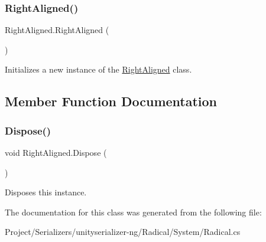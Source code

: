 \subsubsection{\texorpdfstring{Right\+Aligned()}{RightAligned()}}
{\footnotesize\ttfamily Right\+Aligned.\+Right\+Aligned (\begin{DoxyParamCaption}{ }\end{DoxyParamCaption})\hspace{0.3cm}{\ttfamily [inline]}}



Initializes a new instance of the \hyperlink{class_right_aligned}{Right\+Aligned} class. 



\subsection{Member Function Documentation}
\mbox{\label{class_right_aligned_aeb1d1e6b5a8a70d2fb506c70eaf1a517}} 
\subsubsection{\texorpdfstring{Dispose()}{Dispose()}}
{\footnotesize\ttfamily void Right\+Aligned.\+Dispose (\begin{DoxyParamCaption}{ }\end{DoxyParamCaption})\hspace{0.3cm}{\ttfamily [inline]}}



Disposes this instance. 



The documentation for this class was generated from the following file\+:\begin{DoxyCompactItemize}
\item 
Project/\+Serializers/unityserializer-\/ng/\+Radical/\+System/Radical.\+cs\end{DoxyCompactItemize}
